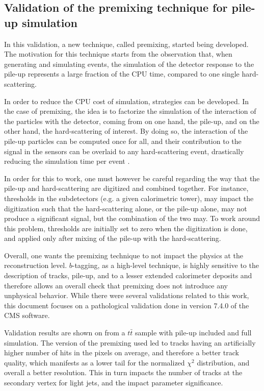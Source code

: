     \subsection{Validation of the premixing technique for pile-up simulation}

    In this validation, a new technique, called premixing, started being
    developed.  The motivation for this technique starts from the observation
    that, when generating and simulating events, the simulation of the detector
    response to the pile-up represents a large fraction of the CPU time,
    compared to one single hard-scattering.

    In order to reduce the CPU cost of simulation, strategies can be developed.
    In the case of premixing, the idea is to factorize the simulation of the
    interaction of the particles with the detector, coming from on one hand, the
    pile-up, and on the other hand, the hard-scattering of interest. By doing
    so, the interaction of the pile-up particles can be computed once for all,
    and their contribution to the signal in the sensors can be overlaid to any
    hard-scattering event, drastically reducing the simulation time per event
    \cite{Premixing}.

    In order for this to work, one must however be careful regarding the way
    that the pile-up and hard-scattering are digitized and combined together.
    For instance, thresholds in the subdetectors (e.g. a given calorimetric
    tower), may impact the digitization such that the hard-scattering alone, or
    the pile-up alone, may not produce a significant signal, but the combination
    of the two may. To work around this problem, thresholds are initially set to
    zero when the digitization is done, and applied only after mixing of the
    pile-up with the hard-scattering.

    Overall, one wants the premixing technique to not impact the physics at the
    reconstruction level. $b$-tagging, as a high-level technique, is highly
    sensitive to the description of tracks, pile-up, and to a lesser extended
    calorimeter deposits and therefore allows an overall check that premixing
    does not introduce any unphysical behavior. While there were several
    validations related to this work, this document focuses on a pathological
    validation done in version 7.4.0 of the CMS software.

    Validation results are shown on
     from a $t\bar{t}$ sample
    with pile-up included and full simulation. The version of the premixing used
    led to tracks having an artificially higher number of hits in the pixels on
    average, and therefore a better track quality, which manifests as a lower
    tail for the normalized $\chi^2$ distribution, and overall a better
    resolution.  This in turn impacts the number of tracks at the secondary
    vertex for light jets, and the impact parameter significance.

